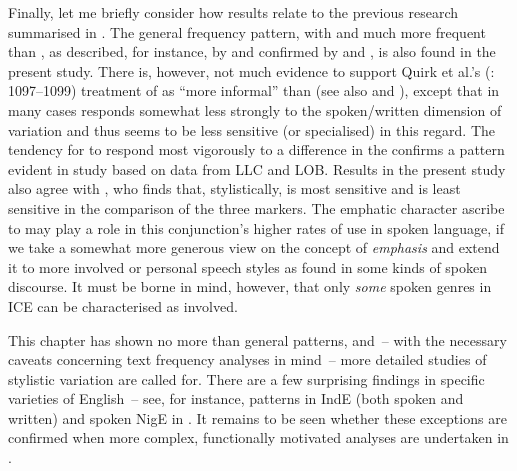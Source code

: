 Finally, let me briefly consider how results relate to the previous research summarised in . The general frequency pattern, with  and  much more frequent than , as described, for instance, by \citet{QuirkEtAl1985} and confirmed by \citet{Altenberg1986} and \citet{Aarts1988}, is also found in the present study. There is, however, not much evidence to support Quirk et al.’s (\citeyear{QuirkEtAl1985}: 1097–1099) treatment of  as “more informal” than  (see also \citealt{BiberEtAl1999} and \citealt{HuddlestonPullum2002}), except that in many cases  responds somewhat less strongly to the spoken/written dimension of variation and thus seems to be less sensitive (or specialised) in this regard. The tendency for  to respond most vigorously to a difference in the  confirms a pattern evident in  study based on data from LLC and LOB. Results in the present study also agree with \citet{Aarts1988}, who finds that, stylistically,  is most sensitive and  is least sensitive in the comparison of the three markers. The emphatic character \citet{QuirkEtAl1985} ascribe to  may play a role in this conjunction’s higher rates of use in spoken language, if we take a somewhat more generous view on the concept of \textit{emphasis} and extend it to more involved or personal speech styles as found in some kinds of spoken discourse. It must be borne in mind, however, that only \textit{some} spoken genres in ICE can be characterised as involved.

This chapter has shown no more than general patterns, and~– with the necessary caveats concerning text frequency analyses in mind~– more detailed studies of stylistic variation are called for. There are a few surprising findings in specific varieties of English~– see, for instance, patterns in IndE (both spoken and written) and spoken NigE in . It remains to be seen whether these exceptions are confirmed when more complex, functionally motivated analyses are undertaken in .

